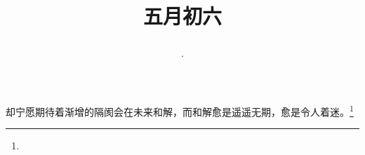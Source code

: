 \title{\date[d=11,m=6,y=2024][year:cn-y,年,month:cn,day:cn,日,·,weekday]·五月初六 }
却宁愿期待着渐增的隔阂会在未来和解，而和解愈是遥遥无期，愈是令人着迷。\footnote{ }

